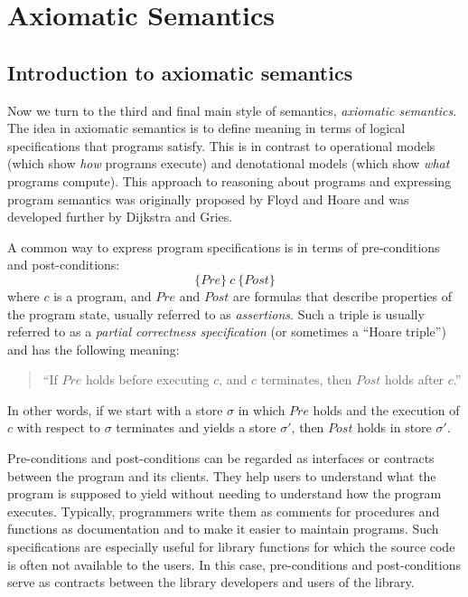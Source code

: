 % 

\chapter{Axiomatic Semantics}

\section{Introduction to axiomatic semantics}

Now we turn to the third and final main style of semantics, \emph{axiomatic semantics}. The
idea in axiomatic semantics is to define meaning in terms of logical specifications that
programs satisfy. This is in contrast to operational models (which show \emph{how} programs
execute) and denotational models (which show \emph{what} programs compute). This approach to
reasoning about programs and expressing program semantics was originally proposed by Floyd and
Hoare and was developed further by Dijkstra and Gries.

A common way to express program specifications is in terms of pre-conditions and
post-conditions:
\[
\{\mathit{Pre}\}\ c\ \{\mathit{Post}\}
\]
where $c$ is a program, and $\mathit{Pre}$ and $\mathit{Post}$ are formulas that describe
properties of the program state, usually referred to as \emph{assertions}. Such a triple is
usually referred to as a \emph{partial correctness specification} (or sometimes a ``Hoare
triple'') and has the following meaning:
\begin{quote}
``If $\mathit{Pre}$ holds before executing $c$, and $c$ terminates, then $\mathit{Post}$ holds
after $c$.''
\end{quote}
In other words, if we start with a store $\sigma$ in which $\mathit{Pre}$ holds and the
execution of $c$ with respect to $\sigma$ terminates and yields a store $\sigma'$, then
$\mathit{Post}$ holds in store $\sigma'$.

Pre-conditions and post-conditions can be regarded as interfaces or contracts between the
program and its clients. They help users to understand what the program is supposed to yield
without needing to understand how the program executes. Typically, programmers write them as
comments for procedures and functions as documentation and to make it easier to maintain
programs. Such specifications are especially useful for library functions for which the source
code is often not available to the users. In this case, pre-conditions and post-conditions
serve as contracts between the library developers and users of the library.

